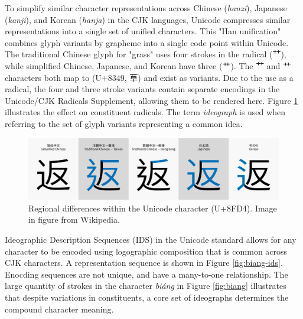 To simplify similar character representations across Chinese (\textit{hanzi}), Japanese (\textit{kanji}), and Korean (\textit{hanja}) in the CJK languages, Unicode compresses similar representations into a single set of unified characters. This "Han unification" combines glyph variants by grapheme into a single code point within Unicode. The traditional Chinese glyph for "grass" uses four strokes in the radical (⺿), while simplified Chinese, Japanese, and Korean have three (⺾). The ⺿ and ⺾ characters both map to (U+8349, 草) and exist as variants. Due to the use as a radical, the four and three stroke variants contain separate encodings in the Unicode/CJK Radicals Supplement, allowing them to be rendered here.
Figure \ref{fig:han-unification} illustrates the effect on constituent radicals. The term \textit{ideograph} is used when referring to the set of glyph variants representing a common idea.

\begin{figure}
    \begin{center}
        \includegraphics[width=1\textwidth]{figures/han_unification.png}
        \caption[Regional Character Variants]{Regional differences within the Unicode character (U+8FD4).
            Image in figure from Wikipedia\cite{wikipedia-han-unification}.}
        \label{fig:han-unification}
    \end{center}
\end{figure}

Ideographic Description Sequences (IDS) in the Unicode standard\cite{unicode-ids} allows for any character to be encoded using logographic composition that is common across CJK characters. A representation sequence is shown in Figure \ref{fig:biang-ids}. Enocding sequences are not unique, and have a many-to-one relationship. The large quantity of strokes in the character \textit{biáng} in Figure \ref{fig:biang} illustrates that despite variations in constituents, a core set of ideographs determines the compound character meaning.

